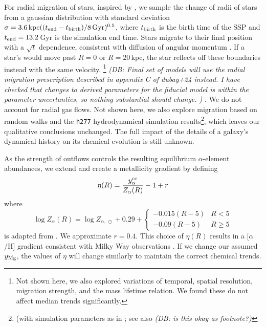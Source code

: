 \documentclass[fleqn,
usenatbib]{mnras}
\newcommand{\JJ}{\citetalias{james+21}}
\newcommand{\dbnote}[1]{ {\color{Thistle} \textit{\small (DB: #1)}} }
\begin{document}
For radial migration of stars, inspired by \citet{frankel18}, we sample the change of radii of stars from a gaussian distribution with standard deviation $\sigma = 3.6\,{\rm kpc} ((t_{\rm end} - t_{\rm birth})/8\,{\rm Gyr})^{0.5}$, where $t_{\rm birth}$ is the birth time of the SSP and $t_{\rm end}=13.2$\,Gyr is the simulation end time.
Stars migrate to their final position with a $\sqrt{t}$ dependence, consistent with diffusion of angular momentum \citep{frankel18, frankel20}. If a star's would move past $R=0$ or $R=20\,$kpc, the star reflects off these boundaries instead with the same velocity.%
\footnote{Not shown here, we also explored variations of temporal, spatial resolution, migration strength, and the mass lifetime relation. We found these do not affect median trends significantly.}
\dbnote{ Final set of models will use the radial migration prescription described in appendix C of {dubay+24} instead. I have checked that changes to derived parameters for the fiducial model is within the parameter uncertanties, so nothing substantial should change. }.
We do not account for radial gas flows.
Not shown here, we also explore migration based on random walks and the \texttt{h277} hydrodynamical
simulation results\footnote{(with simulation parameters as in \citealt{bird+21}; see also \citealt{christensen12, zolotov12, loebman12, BZ14} \dbnote{is this okay as footnote?} }, which leaves our qualitative conclusions unchanged. 
The full impact of the details of a galaxy's dynamical history on its chemical evolution is still unknown.

As the strength of outflows controls the resulting equilibrium $\alpha$-element abundances, we extend \JJ and create a metallicity gradient by defining
\begin{equation}\label{eq:mass_loading}
\eta(R) = \frac{y_{\alpha}^{\rm cc}}{Z_{\alpha}(R)} -1 + r %
\end{equation}
where 
\begin{equation}
    \log Z_{\alpha}(R) = \log Z_{\alpha,\ \odot} + 
    0.29 + 
    \begin{cases}
        -0.015(R-5) & R < 5 \\
        -0.09(R-5) & R \geq 5
    \end{cases}
\end{equation}
is adapted from \citet{hayden+14}.  We approximate $r=0.4$. %
This choice of $\eta(R)$ results in a [$\alpha$/H] gradient consistent with Milky Way observations \citep[e.g.][]{hayden+14, weinberg+19, frinchaboy+13}.
If we change our assumed $y_{\rm Mg}$, the values of $\eta$ will change similarly to maintain the correct chemical trends.
\end{document}
